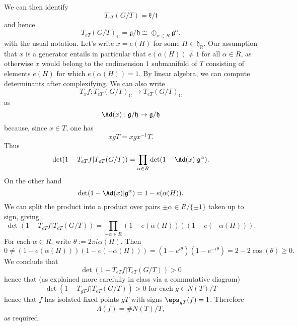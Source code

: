 \documentclass[reqno]{amsart} 
\begin{document}
We can then identify
\begin{equation*}
  T_{e T}(G/T) = \mathfrak{k} / \mathfrak{t}
\end{equation*}
and hence
\begin{equation*}
  T_{e T}(G/T)_{\mathbb{C}} = \mathfrak{g} / \mathfrak{h} \cong \oplus_{\alpha \in R} \mathfrak{g}^\alpha.
\end{equation*}
with the usual notation.  Let's write $x = e(H)$ for some $H \in \mathfrak{h}_\mathbb{R}$.  Our assumption that $x$ is a generator entails in particular that $e(\alpha(H)) \neq 1$ for all $\alpha \in R$, as otherwise $x$ would belong to the codimension $1$ submanifold of $T$ consisting of elements $e(H)$ for which $e(\alpha(H)) = 1$.  By linear algebra, we can compute determinants after complexifying.  We can also write
\begin{equation*}
  T_x f : T_{e T}(G/T)_{\mathbb{C}} \rightarrow T_{e T}(G/T) _{\mathbb{C}}
\end{equation*}
as
\begin{equation*}
  \Ad(x) : \mathfrak{g}/\mathfrak{h} \rightarrow \mathfrak{g}/\mathfrak{h}
\end{equation*}
because, since $x \in T$, one has
\begin{equation*}
  x g T = x g x^{-1} T.
\end{equation*}
Thus
\begin{equation*}
  \det(1 - T_{e T} f | T_{e T}(G/T)) = \prod_{\alpha \in R} \det(1 - \Ad(x) | \mathfrak{g}^\alpha).
\end{equation*}
On the other hand
\begin{equation*}
  \det(1 - \Ad(x) | \mathfrak{g}^\alpha) = 1 - e(\alpha(H)).
\end{equation*}
We can split the product into a product over pairs $\pm \alpha \in R / \{\pm 1\}$ taken up to sign, giving
\begin{equation*}
  \det(1 - T_{e T} f | T_{e T}(G/T)) = \prod_{\pm \alpha \in R} (1 - e(\alpha(H))) (1 - e(-\alpha(H))).
\end{equation*}
For each $\alpha \in R$, write $\theta := 2 \pi i \alpha(H)$.  Then
\begin{equation*}
  0 \neq (1 - e(\alpha(H))) (1 - e(-\alpha(H))) = (1 - e^{i \theta}) (1 - e^{-i \theta}) = 2 - 2 \cos(\theta) \geq 0.
\end{equation*}
We conclude that
\begin{equation*}
  \det(1 - T_{e T} f | T_{e T}(G/T)) > 0
\end{equation*}
hence that (as explained more carefully in class via a commutative diagram)
\begin{equation*}
  \det(1 - T_{g T} f | T_{e T}(G/T)) > 0 \text{ for each } g \in N(T)/T
\end{equation*}
hence that $f$ has isolated fixed points $g T$ with signs $\eps_{g T}(f) = 1$.  Therefore
\begin{equation*}
  \Lambda(f) = \# N(T)/T,
\end{equation*}
as required.
\end{document}
